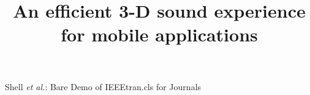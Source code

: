 \documentclass[journal]{IEEEtran}
\begin{document}
%
\title{An efficient 3-D sound experience for mobile applications}


\author{
}



% 





%
{Shell \MakeLowercase{\textit{et al.}}: Bare Demo of IEEEtran.cls for Journals}
% 
\end{document}
